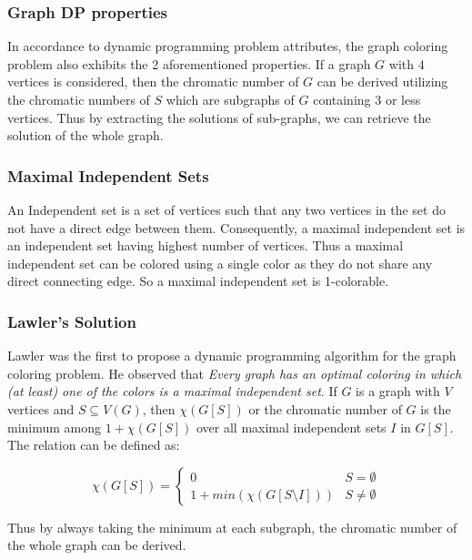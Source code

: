 \documentclass[14pt]{extreport}
\begin{document}
		\vspace{10pt} 
		
		\subsubsection*{Graph DP properties}
		In accordance to dynamic programming problem attributes, the graph coloring  problem also exhibits the 2 aforementioned properties. If a graph $G$ with $4$ vertices is considered, then the chromatic number of $G$ can be derived utilizing the chromatic numbers of $S$ which are subgraphs of $G$ containing $3$ or less vertices. Thus by extracting the solutions of sub-graphs, we can retrieve the solution of the whole graph. 
		\\
		
		\subsubsection*{Maximal Independent Sets}
		An Independent set is a set of vertices such that any two vertices in the set do not have a direct edge between them. Consequently, a maximal independent set is an independent set having highest number of vertices. Thus a maximal independent set can be colored using a single color as they do not share any direct connecting edge. So a maximal independent set is 1-colorable.
		\\
		
		\pagebreak
		
		\subsubsection*{Lawler's Solution}
		Lawler\cite{LAWLER197666} was the ﬁrst to propose a dynamic programming algorithm for the graph coloring problem. He observed that \emph{Every graph has an optimal coloring in which (at least) one of the colors is a maximal independent set}. If $G$ is a graph with $V$ vertices and $S \subseteq V(G)$, then $\chi(G[S])$ or the chromatic number of $G$ is the minimum among $1+\chi(G[S])$ over all maximal independent sets $I$ in $G[S]$. The relation can be defined as:
		
		 \[ 
		  \chi(G[S]) = \begin{cases} 
              0 & S = \emptyset\\
              1 + min(\chi(G[S\setminus I]))  & S \neq \emptyset
           \end{cases}
        \]
        
        Thus by always taking the minimum at each subgraph, the chromatic number of the whole graph can be derived. 
	
\end{document}
